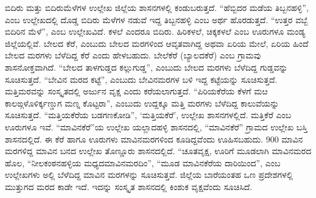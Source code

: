 ಬಿದಿರು ಮತ್ತು ಬಿದಿರುಮೆಳೆಗಳ ಉಲ್ಲೇಖ ಜಿಲ್ಲೆಯ ಶಾಸನಗಳಲ್ಲಿ ಕಂಡುಬರುತ್ತದೆ. “ಹೆಬ್ಬಿದರ ಮಡೆಯ ತಿಬ್ಬನಹಳ್ಳಿ”, ಎಂಬ ಉಲ್ಲೇಖದಲ್ಲಿ ದೊಡ್ಡ ಬಿದಿರು ಮೆಳೆಗಳ ನಡುವೆ ಇದ್ದ ತಿಬ್ಬನಹಳ್ಳಿ ಎಂಬ ಅರ್ಥ ಹೊರಡುತ್ತದೆ. “ಉತ್ತರ ವಬ್ಬೆ ಬಿದಿರಿನ ಮೆಳೆ”, ಎಂಬ ಉಲ್ಲೇಖವಿದೆ. ಕಳಲೆ ಎಂದರೂ ಬಿದಿರು. ಹಿರಿಕಳಲೆ, ಚಿಕ್ಕಕಳಲೆ ಎಂಬ ಊರುಗಳೂ ಮಂಡ್ಯ ಜಿಲ್ಲೆಯಲ್ಲಿವೆ. ಬೇಲದ ಕೆರೆ, ಎಂಬುದು ಬೇಲದ ಮರಗಳಿಂದ ಆವೃತವಾಗಿದ್ದ ಅಥವಾ ಏರಿಯ ಮೇಲೆ, ಏರಿಯ ಹಿಂದೆ ಬೇಲದ ಮರಗಳು ಬೆಳೆದಿದ್ದ ಕೆರೆ ಎಂದು ಹೇಳಬಹುದು. ಬೇಲೆಕೆರೆ (ಬ್ಯಾಲದಕೆರೆ) ಎಂಬ ಗ್ರಾಮವು ಶಾಸನೋಕ್ತವಾಗಿದೆ. “ಬೇಲದ ತಾಳಗುಡ್ಡದ ಕಲ್ಲುಗುಡ್ಡ”, ಎಂಬುದು ಬೇಲದ ಮರಗಳು ಬೆಳೆದಿದ್ದ ಗುಡ್ಡವನ್ನು ಸೂಚಿಸುತ್ತದೆ. “ಬೇವಿನ ಮರದ ಕಟ್ಟೆ”, ಎಂಬುದು ಬೇವಿನಮರಗಳ ಬಳಿ ಇದ್ದ ಕಟ್ಟೆಯನ್ನು ಸೂಚಿಸುತ್ತದೆ. ಮತ್ತಿಮರವನ್ನು ಸಂಸ್ಕೃತದಲ್ಲಿ ಅರ್ಜುನ ವೃಕ್ಷ ಎಂದು ಕರೆಯಲಾಗುತ್ತದೆ. “ಪಿರಿಯಕೆರೆಯ ಕೆಳಗೆ ಮೞ ಕಾಲಙ್ಗಳೊಳಿರ್ಕ್ಕಣ್ಡುಗ ಮಣ್ನ ಕೊಟ್ಟರಾ”, ಎಂಬುದು ಉದ್ದಕ್ಕೂ ಮತ್ತಿ ಮರಗಳು ಬೆಳೆದಿದ್ದ ಕಾಲುವೆಯನ್ನು ಸೂಚಿಸುತ್ತದೆ. “ಮತ್ತಿಯಕೆರೆಯ ಬಡಗಣಕೋಡಿ”, ‘ಮತ್ತಿಯಕೆರೆ’, ಉಲ್ಲೇಖ ಶಾಸನಗಳಲ್ಲಿದೆ. ಮತ್ತಿಕೆರೆ ಎಂಬ ಊರುಗಳೂ ಇವೆ. “ಮಾವಿನಕೆರೆ”ಯ ಉಲ್ಲೇಖ ಯಲ್ಲಾದಹಳ್ಳಿ ಶಾಸನದಲ್ಲಿ, “ಮಾವಿನಕೆರೆ” ಗ್ರಾಮದ ಉಲ್ಲೇಖ ಬಸ್ತಿ ಶಾಸನದಲ್ಲಿದೆ. ಈ ಕೆರೆ ಹಾಗೂ ಊರುಗಳು ಮಾವಿನಮರಗಳಿಂದ ಕೂಡಿದ್ದವೆಂದು ಊಹಿಸಬಹುದು. 900 ಮಾವಿನ ಮರಗಳಿದ್ದ ಮಾವಿನ ಬನದ ಉಲ್ಲೇಖ ತೊಣ್ಣೂರು ಶಾಸನದಲ್ಲಿದೆ. “ಚೂತವೃಕ್ಷ, ಊರಿಗೆ ಮೂಡಲಾಗಿ ಮಾವಿನಮರದ ಹೊಲ, “ನೀಲಕಂಠನಹಳ್ಳಿಯ ಮಧ್ಯದ\break ಮಾವಿನಮರದಿಂ”, “ಮೂಡ ಮಾವಿನಕೆರೆಯ ದಾರಿಯಿಂದ”, ಎಂಬ ಉಲ್ಲೇಖಗಳು ಅಲ್ಲಿ ಬೆಳೆದಿದ್ದ ಮಾವಿನ ಮರಗಳನ್ನು ಸೂಚಿಸುತ್ತವೆ. ಜಿಲ್ಲೆಯ ಬಾರೆಯಂತಹ ಒಣ ಪ್ರದೇಶಗಳಲ್ಲಿ ಮುತ್ತುಗದ ಮರದ ಕಾಡೇ ಇದೆ. ಇದನ್ನು ಸಂಸ್ಕೃತ ಶಾಸನದಲ್ಲಿ ಕಿಂಶುಕ ವೃಕ್ಷವೆಂದು ಸೂಚಿಸಿದೆ.

